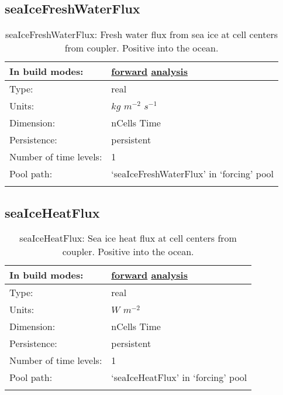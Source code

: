 \subsection[seaIceFreshWaterFlux]{seaIceFreshWaterFlux}
\label{subsec:var_sec_forcing_seaIceFreshWaterFlux}
\begin{center}
\begin{longtable}{| p{2.0in} | p{4.0in} |}
        \hline 
        In build modes: & \hyperref[subsec:forward_var_tab_forcing]{forward} \hyperref[subsec:analysis_var_tab_forcing]{analysis} \\
        \hline 
        Type: & real \\
        \hline 
        Units: & $kg$ $m^{-2}$ $s^{-1}$ \\
        \hline 
        Dimension: & nCells Time \\
        \hline 
        Persistence: & persistent \\
        \hline 
        Number of time levels: & 1 \\
        \hline 
            Pool path: & `seaIceFreshWaterFlux' in `forcing' pool \\
		 \hline 
    \caption{seaIceFreshWaterFlux: Fresh water flux from sea ice at cell centers from coupler. Positive into the ocean.}
\end{longtable}
\end{center}
\subsection[seaIceHeatFlux]{seaIceHeatFlux}
\label{subsec:var_sec_forcing_seaIceHeatFlux}
\begin{center}
\begin{longtable}{| p{2.0in} | p{4.0in} |}
        \hline 
        In build modes: & \hyperref[subsec:forward_var_tab_forcing]{forward} \hyperref[subsec:analysis_var_tab_forcing]{analysis} \\
        \hline 
        Type: & real \\
        \hline 
        Units: & $W$ $m^{-2}$ \\
        \hline 
        Dimension: & nCells Time \\
        \hline 
        Persistence: & persistent \\
        \hline 
        Number of time levels: & 1 \\
        \hline 
            Pool path: & `seaIceHeatFlux' in `forcing' pool \\
		 \hline 
    \caption{seaIceHeatFlux: Sea ice heat flux at cell centers from coupler. Positive into the ocean.}
\end{longtable}
\end{center}
